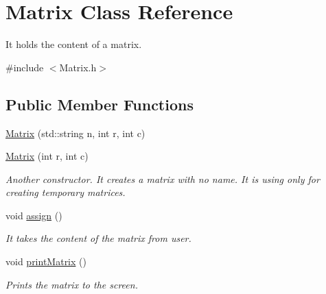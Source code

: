 \hypertarget{class_matrix}{}\section{Matrix Class Reference}
\label{class_matrix}


It holds the content of a matrix.  




{\ttfamily \#include $<$Matrix.\+h$>$}

\subsection*{Public Member Functions}
\begin{DoxyCompactItemize}
\item 
\hyperlink{class_matrix_aad0f8fc2b1b0540e965d762e154452d9}{Matrix} (std\+::string n, int r, int c)
\item 
\hyperlink{class_matrix_a07a3cee5bc286ca27ceffe81ce5a2d01}{Matrix} (int r, int c)
\begin{DoxyCompactList}\small\item\em Another constructor. It creates a matrix with no name. It is using only for creating temporary matrices. \end{DoxyCompactList}\item 
void \hyperlink{class_matrix_a5514edd105f92133665eee545230e3fd}{assign} ()
\begin{DoxyCompactList}\small\item\em It takes the content of the matrix from user. \end{DoxyCompactList}\item 
void \hyperlink{class_matrix_aa1967ad240a5ffaf492800044b7275d9}{print\+Matrix} ()
\begin{DoxyCompactList}\small\item\em Prints the matrix to the screen. \end{DoxyCompactList}\end{DoxyCompactItemize}
